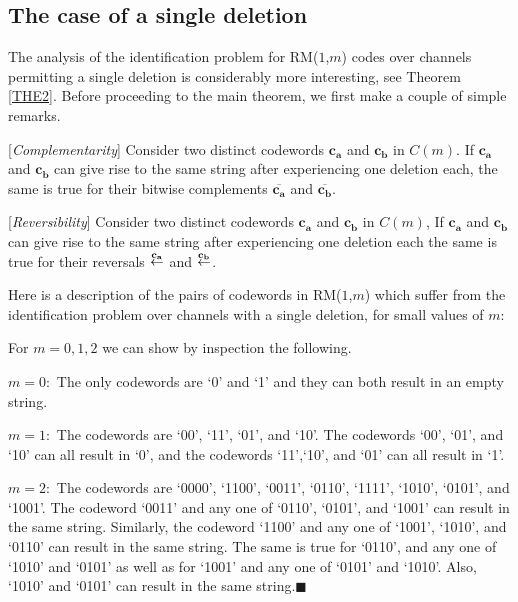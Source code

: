 \subsection{The case of a single deletion}

The analysis of the identification problem for RM($1$,$m$)
codes over channels permitting a single deletion is considerably
more interesting, see Theorem \ref{THE2}.
Before proceeding to the main theorem, we first make
a couple of simple remarks.

\begin{remark}\label{Re31}
[\textit{Complementarity}] Consider two distinct codewords
$\mathbf{c_a}$ and $\mathbf{c_b}$ in $C(m)$. If $\mathbf{c_a}$ and
$\mathbf{c_b}$ can give rise to the same string after experiencing
one deletion each, the same is true for their bitwise complements
$\overline{\mathbf{c_a}}$ and $\overline{\mathbf{c_b}}$.
\end{remark}

\begin{remark}\label{Re32}
[\textit{Reversibility}] Consider two distinct codewords
$\mathbf{c_a}$ and $\mathbf{c_b}$ in $C(m)$, If $\mathbf{c_a}$ and
$\mathbf{c_b}$ can give rise to the same string after experiencing
one deletion each the same is true for their reversals ${\revca}$
and ${\revcb}$.
\end{remark}

Here is a description of the pairs of codewords in RM($1$,$m$)
which suffer from the identification problem over channels with a
single deletion, for small values of $m$:

\begin{remark}\label{re:RE2}
For $m=0,1,2$ we can show by inspection the following.

$m=0:$ The only codewords are `0' and `1' and they can both result
in an empty string.

$m=1:$ The codewords are `00', `11', `01', and `10'. The codewords
`00', `01', and `10' can all result in `0', and the codewords
`11',`10', and `01' can all result in `1'.

$m=2:$ The codewords are `0000', `1100', `0011', `0110', `1111',
`1010', `0101', and `1001'. The codeword `0011' and any one of
`0110', `0101', and `1001' can result in the same string.
Similarly, the codeword `1100' and any one of `1001', `1010', and
`0110' can result in the same string. The same is true for `0110',
and any one of `1010' and `0101' as well as for `1001' and any one
of `0101' and `1010'. Also, `1010' and `0101' can result in the
same string.\hfill $\blacksquare$
\end{remark}

